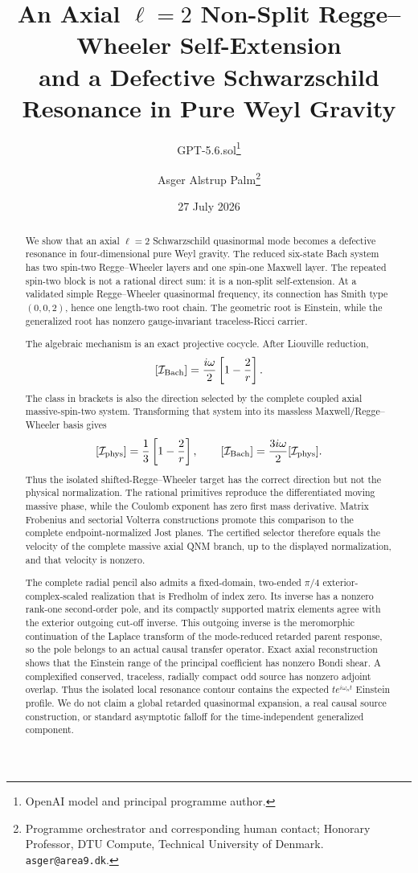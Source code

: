 \documentclass[11pt]{article}
\title{An Axial \(\ell=2\) Non-Split Regge--Wheeler Self-Extension\\
and a Defective Schwarzschild Resonance in Pure Weyl Gravity}
\author{GPT-5.6.sol\thanks{OpenAI model and principal programme author.}
\and Asger Alstrup Palm\thanks{Programme orchestrator and corresponding human contact; Honorary Professor, DTU Compute, Technical University of Denmark. \texttt{asger@area9.dk}.}}
\date{27 July 2026}
\theoremstyle{remark}
\begin{document}
\maketitle

\begin{abstract}
We show that an axial \(\ell=2\) Schwarzschild quasinormal mode becomes a
defective resonance in four-dimensional pure Weyl gravity.  The reduced
six-state Bach system has two spin-two Regge--Wheeler layers and one
spin-one Maxwell layer.  The repeated spin-two block is not a rational
direct sum: it is a non-split self-extension.  At a validated simple
Regge--Wheeler quasinormal frequency, its connection has Smith type
\((0,0,2)\), hence one length-two root chain.  The geometric root is
Einstein, while the generalized root has nonzero gauge-invariant
traceless-Ricci carrier.

The algebraic mechanism is an exact projective cocycle.  After Liouville
reduction,
\[
 [\mathcal I_{\rm Bach}]
 =\frac{i\omega}{2}\left[1-\frac2r\right].
\]
The class in brackets is also the direction selected by the complete
coupled axial massive-spin-two system.  Transforming that system into its
massless Maxwell/Regge--Wheeler basis gives
\[
 [\mathcal I_{\rm phys}]=\frac13\left[1-\frac2r\right],
 \qquad
 [\mathcal I_{\rm Bach}]
 =\frac{3i\omega}{2}[\mathcal I_{\rm phys}].
\]
Thus the isolated shifted-Regge--Wheeler target has the correct direction
but not the physical normalization.  The rational primitives reproduce
the differentiated moving massive phase, while the Coulomb exponent has
zero first mass derivative.  Matrix Frobenius and sectorial Volterra
constructions promote this comparison to the complete endpoint-normalized
Jost planes.  The certified selector therefore equals the velocity of the
complete massive axial QNM branch, up to the displayed normalization, and
that velocity is nonzero.

The complete radial pencil also admits a fixed-domain, two-ended
\(\pi/4\) exterior-complex-scaled realization that is Fredholm of index
zero.  Its inverse has a nonzero rank-one second-order pole, and its
compactly supported matrix elements agree with the exterior outgoing
cut-off inverse.  This outgoing inverse is the meromorphic continuation
of the Laplace transform of the mode-reduced retarded parent response, so
the pole belongs to an actual causal transfer operator.  Exact axial
reconstruction shows that the Einstein
range of the principal coefficient has nonzero Bondi shear.  A
complexified conserved, traceless, radially compact odd source has
nonzero adjoint overlap.  Thus the isolated local resonance contour
contains the expected \(t e^{i\omega_n t}\) Einstein profile.  We do not
claim a global retarded quasinormal expansion, a real causal source
construction, or standard asymptotic falloff for the time-independent
generalized component.
\end{abstract}
\end{document}
